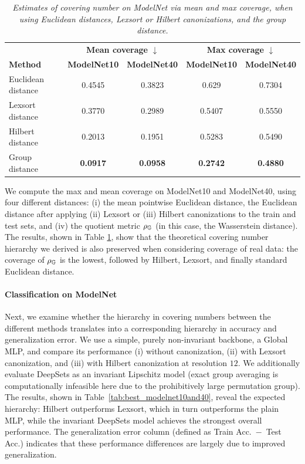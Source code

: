 \begin{table}[h]
\centering
\caption{\it Estimates of covering number on ModelNet via mean and max coverage, when using Euclidean distances, Lexsort or Hilbert canonizations, and the group distance.}
\label{tab:distances_both}
\begin{tabular}{lcccc}
\toprule
 & \multicolumn{2}{c}{\textbf{Mean coverage} $\downarrow$}
 & \multicolumn{2}{c}{\textbf{Max coverage} $\downarrow$} \\
\textbf{Method}
& \textbf{ModelNet10}
& \textbf{ModelNet40}
& \textbf{ModelNet10}
& \textbf{ModelNet40} \\
\midrule
Euclidean distance & 0.4545 & 0.3823 & 0.629  & 0.7304 \\
Lexsort distance    & 0.3770 & 0.2989 & 0.5407 & 0.5550 \\
Hilbert distance & 0.2013 & 0.1951 & 0.5283 & 0.5490 \\
Group distance   & \textbf{0.0917} & \textbf{0.0958} & \textbf{0.2742} & \textbf{0.4880} \\
\bottomrule
\end{tabular}
\end{table}

We compute the max and mean coverage on ModelNet10 and ModelNet40, using four different distances: (i) the mean pointwise Euclidean distance,  the Euclidean distance after applying (ii) Lexsort or (iii) Hilbert canonizations to the train and test sets, and (iv) the quotient metric $\rho_{\mathbb{G}} $ (in this case, the Wasserstein distance). The results, shown in Table \ref{tab:distances_both}, show that the theoretical covering number hierarchy we derived is also preserved when considering coverage of real data: the coverage of  $\rho_{\mathbb{G}} $ is the lowest, followed by Hilbert, Lexsort, and finally standard Euclidean distance.

\paragraph{Classification on ModelNet}
Next, we examine whether the hierarchy in covering numbers between the different methods translates into a corresponding hierarchy in accuracy and generalization error. We use a simple, purely non-invariant backbone, a Global MLP, and compare its performance (i) without canonization, (ii) with Lexsort canonization, and (iii) with Hilbert canonization at resolution $12$. We additionally evaluate DeepSets as an invariant Lipschitz model (exact group averaging is computationally infeasible here due to the prohibitively large permutation group). The results, shown in Table~\ref{tab:best_modelnet10and40}, reveal the expected hierarchy: Hilbert outperforms Lexsort, which in turn outperforms the plain MLP, while the invariant DeepSets model achieves the strongest overall performance. The generalization error column (defined as Train Acc.~$-$~Test Acc.) indicates that these performance differences are largely due to improved generalization.

